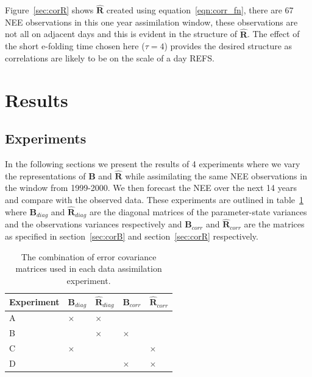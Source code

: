 \documentclass[11pt]{article}
\begin{document}
Figure~\ref{sec:corR} shows $\hat{\mathbf{R}}$ created using equation~\ref{eqn:corr_fn}, there are 67 NEE observations in this one year assimilation window, these observations are not all on adjacent days and this is evident in the structure of $\hat{\mathbf{R}}$. The effect of the short e-folding time chosen here ($\tau=4$) provides the desired structure as correlations are likely to be on the scale of a day REFS. 

\section{Results} \label{sec:results}

\subsection{Experiments} \label{sec:exps}

In the following sections we present the results of 4 experiments where we vary the representations of $\textbf{B}$ and $\hat{\mathbf{R}}$ while assimilating the same NEE observations in the window from 1999-2000. We then forecast the NEE over the next 14 years and compare with the observed data. These experiments are outlined in table~\ref{table:exps_tab} where $\textbf{B}_{diag}$ and $\hat{\mathbf{R}}_{diag}$ are the diagonal matrices of the parameter-state variances and the observations variances respectively and $\textbf{B}_{corr}$ and $\hat{\mathbf{R}}_{corr}$ are the matrices as specified in section~\ref{sec:corB} and section~\ref{sec:corR} respectively.

\begin{table}[ht] 
\begin{center}
	\begin{tabular}{| l | l | l | l | l |}
	\hline
	Experiment & $\textbf{B}_{diag}$ & $\hat{\mathbf{R}}_{diag}$ & $\textbf{B}_{corr}$ &
	$\hat{\mathbf{R}}_{corr}$ \\ \hline
	A & $\times$ & $\times$ & & \\ \hline
	B & & $\times$ & $\times$ & \\ \hline
	C & $\times$ & & & $\times$ \\ \hline
	D & & & $\times$ & $\times$ \\ 
	\hline
	\end{tabular}
	\caption{The combination of error covariance matrices used in each data assimilation experiment.}
	\label{table:exps_tab}
\end{center} 
\end{table}
\end{document}
